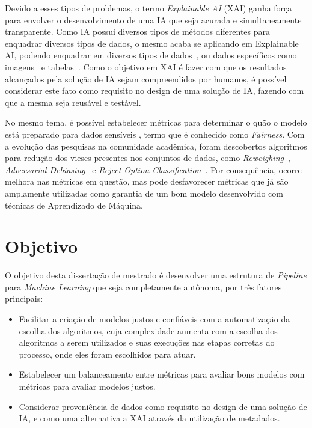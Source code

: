 \documentclass[portugues]{ic-tese}
\begin{document}
Devido a esses tipos de problemas, o termo \textit{Explainable AI} (XAI) ganha força para envolver o desenvolvimento de uma IA que seja acurada e simultaneamente transparente. Como IA possui diversos tipos de métodos diferentes para enquadrar diversos tipos de dados, o mesmo acaba se aplicando em Explainable AI, podendo enquadrar em diversos tipos de dados~\citep{Sundararajan_2017}, ou dados específicos como imagens~\citep{Kapishnikov_2019} e tabelas~\citep{Maleki_2013}. Como o objetivo em XAI é fazer com que os resultados alcançados pela solução de IA sejam compreendidos por humanos, é possível considerar este fato como requisito no design de uma solução de IA, fazendo com que a mesma seja reusável e testável.

No mesmo tema, é possível estabelecer métricas para determinar o quão o modelo está preparado para dados sensíveis \citep{Begley_2021}, termo que é conhecido como \textit{Fairness}. Com a evolução das pesquisas na comunidade acadêmica, foram descobertos algoritmos para redução dos vieses presentes nos conjuntos de dados, como \textit{Reweighing}~\citep{Kamiran_2011}, \textit{Adversarial Debiasing}~\citep{Zhang_2018} e \textit{Reject Option Classification}~\citep{Kamiran_2012}. Por consequência, ocorre melhora nas métricas em questão, mas pode desfavorecer métricas que já são amplamente utilizadas como garantia de um bom modelo desenvolvido com técnicas de Aprendizado de Máquina.

\section{Objetivo}

O objetivo desta dissertação de mestrado é desenvolver uma estrutura de \textit{Pipeline} para \textit{Machine Learning} que seja completamente autônoma, por três fatores principais:

\begin{itemize}
\item Facilitar a criação de modelos justos e confiáveis com a automatização da escolha dos algoritmos, cuja complexidade aumenta com a escolha dos algoritmos a serem utilizados e suas execuções nas etapas corretas do processo, onde eles foram escolhidos para atuar.
\item Estabelecer um balanceamento entre métricas para avaliar bons modelos com métricas para avaliar modelos justos.
\item Considerar proveniência de dados como requisito no design de uma solução de IA, e como uma alternativa a XAI através da utilização de metadados.
\end{itemize}
\end{document}
